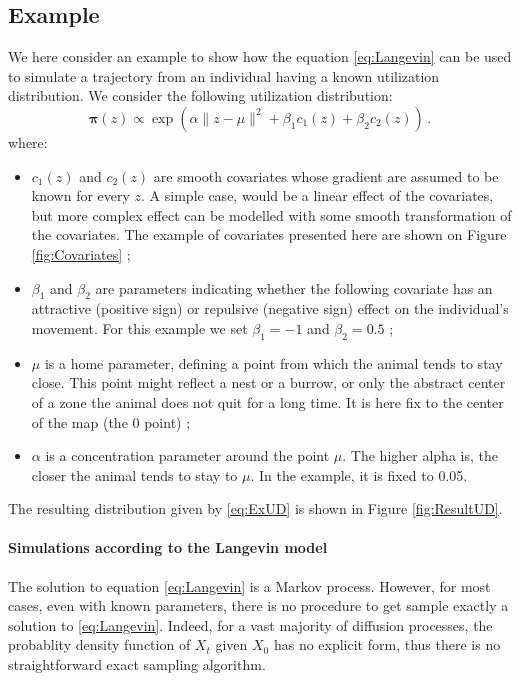 \documentclass[10pt,a4paper]{article}
\newcommand{\ud}{\boldsymbol{\pi}}
\begin{document}
\subsection{Example}
We here consider an example to show how the equation \eqref{eq:Langevin} can be used to simulate a trajectory from an individual having a known utilization distribution. We consider the following utilization distribution:
\begin{equation}
\label{eq:ExUD}
\ud(z) \propto \exp\left( \alpha\parallel z - \mu\parallel^2 + \beta_1 c_1(z) + \beta_2 c_2(z) \right)\,.
\end{equation}
where:
\begin{itemize}
\item $c_1(z)$ and $c_2(z)$ are smooth covariates whose gradient are assumed to be known for every $z$. A simple case, would be a linear effect of the covariates, but more complex effect can be modelled with some smooth transformation of the covariates. The example of covariates presented here are shown on Figure \ref{fig:Covariates} ;
\item $\beta_1$ and $\beta_2$ are parameters indicating whether the following covariate has an attractive (positive sign) or repulsive (negative sign) effect on the individual's movement. For this example we set $\beta_1 = -1$ and $\beta_2 = 0.5$ ;
\item $\mu$ is a home parameter, defining a point from which the animal tends to stay close. This point might reflect a nest or a burrow, or only the abstract center of a zone the animal does not quit for a long time. It is here fix to the center of the map (the 0 point) ;
\item $\alpha$ is a concentration parameter around the point $\mu$. The higher alpha is, the closer the animal tends to stay to $\mu$.
In the example, it is fixed to 0.05.
\end{itemize}
The resulting distribution given by \eqref{eq:ExUD} is shown in Figure \ref{fig:ResultUD}.

\paragraph{Simulations according to the Langevin model} The solution to equation \eqref{eq:Langevin} is a Markov process. However, for most cases, even with known parameters, there is no procedure to get sample exactly a solution to \eqref{eq:Langevin}. Indeed, for a vast majority of diffusion processes, the probablity density function of $X_{t}$ given  $X_0$ has no explicit form, thus there is no straightforward exact sampling algorithm.
\end{document}

